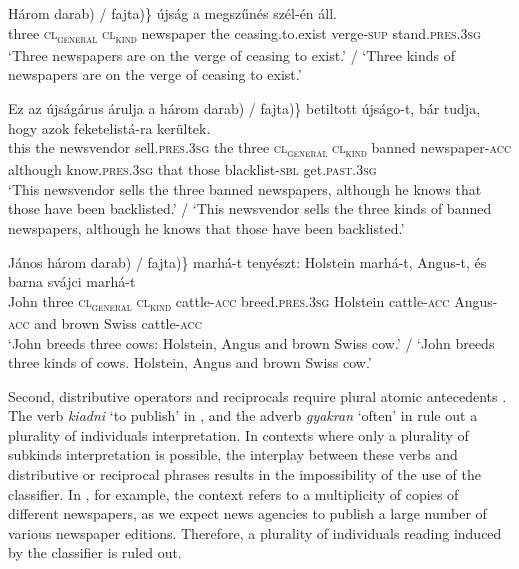 \documentclass[output=paper]{langscibook}
\begin{document}
\ea \label{schv-nem:ex:10}
\gll Három \minsp{\{(*} darab) / \minsp{(} fajta)\} újság a megszűnés szél-én áll. \\
three {} \textsc{cl\textsubscript{general}} {} {} \textsc{cl\textsubscript{kind}} newspaper the ceasing.to.exist verge-\textsc{sup} stand.\textsc{pres}.\textsc{3sg}\\
\glt `Three newspapers are on the verge of ceasing to exist.' / `Three kinds of newspapers are on the verge of ceasing to exist.'
\z

\ea \label{schv-nem:ex:11}
\gll Ez az újságárus árulja a három \minsp{\{(*} darab) / \minsp{(} fajta)\}  betiltott újságo-t, bár tudja, hogy azok feketelistá-ra kerültek. \\
this the newsvendor sell.\textsc{pres}.\textsc{3sg}  the  three  {} \textsc{cl\textsubscript{general}} {} {} \textsc{cl\textsubscript{kind}} banned newspaper-\textsc{acc} although know.\textsc{pres}.\textsc{3sg} that those blacklist-\textsc{sbl} get.\textsc{past}.\textsc{3sg}\\
\glt `This newsvendor sells the three banned newspapers, although he knows that those have been backlisted.' / `This newsvendor sells the three kinds of banned newspapers, although he knows that those have been backlisted.'
\z

\ea \label{schv-nem:ex:12}
\gll János három \minsp{\{(*} darab) / \minsp{(} fajta)\} marhá-t tenyészt: Holstein marhá-t, Angus-t, és barna svájci marhá-t \\
 John three {} \textsc{cl\textsubscript{general}} {} {} \textsc{cl\textsubscript{kind}} cattle-\textsc{acc} breed.\textsc{pres}.\textsc{3sg}  Holstein cattle-\textsc{acc} Angus-\textsc{acc} and brown Swiss cattle-\textsc{acc} \\
\glt `John breeds three cows: Holstein, Angus and brown Swiss cow.' / `John breeds three kinds of cows. Holstein, Angus and brown Swiss cow.'
\z


\noindent Second, distributive operators and reciprocals require plural atomic antecedents \citep{link-83, rotstein-09, schwarzschild-11, schvarcz-14}. The verb \textit{kiadni} `to publish' in , and the adverb \textit{gyakran} `often' in  rule out a plurality of individuals interpretation.  In contexts where only  a plurality of subkinds interpretation is possible, the interplay between these verbs and distributive or reciprocal phrases results in the impossibility of the use of the classifier.  In , for example, the context refers to a multiplicity of copies of different newspapers, as we expect news agencies to publish a large number of  various newspaper editions. Therefore, a plurality of individuals reading induced by the classifier is ruled out.
\end{document}
